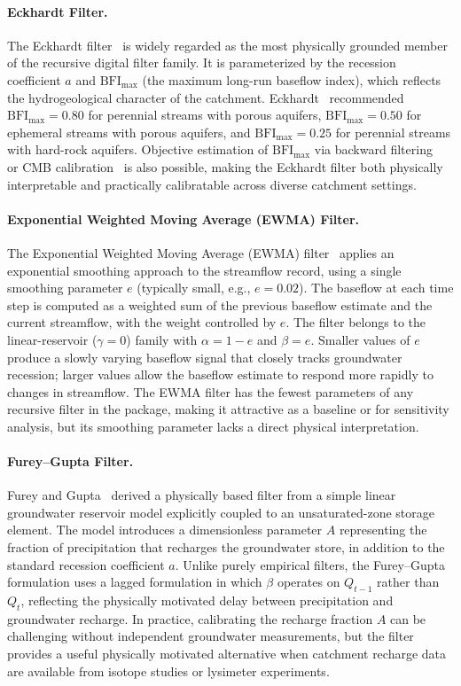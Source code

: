 \documentclass[hydrology,article,submit,pdftex,moreauthors]{Definitions/mdpi}
\begin{document}
\paragraph{Eckhardt Filter.}
The Eckhardt filter~\cite{Eckhardt2005} is widely regarded as the most physically grounded member of the recursive digital filter family. It is parameterized by the recession coefficient $a$ and $\mathrm{BFI_{max}}$ (the maximum long-run baseflow index), which reflects the hydrogeological character of the catchment. Eckhardt~\cite{Eckhardt2005} recommended $\mathrm{BFI_{max}} = 0.80$ for perennial streams with porous aquifers, $\mathrm{BFI_{max}} = 0.50$ for ephemeral streams with porous aquifers, and $\mathrm{BFI_{max}} = 0.25$ for perennial streams with hard-rock aquifers. Objective estimation of $\mathrm{BFI_{max}}$ via backward filtering~\cite{Collischonn2013} or CMB calibration~\cite{Stewart2007} is also possible, making the Eckhardt filter both physically interpretable and practically calibratable across diverse catchment settings.

\paragraph{Exponential Weighted Moving Average (EWMA) Filter.}
The Exponential Weighted Moving Average (EWMA) filter~\cite{Tularam2008} applies an exponential smoothing approach to the streamflow record, using a single smoothing parameter $e$ (typically small, e.g., $e = 0.02$). The baseflow at each time step is computed as a weighted sum of the previous baseflow estimate and the current streamflow, with the weight controlled by $e$. The filter belongs to the linear-reservoir ($\gamma = 0$) family with $\alpha = 1-e$ and $\beta = e$. Smaller values of $e$ produce a slowly varying baseflow signal that closely tracks groundwater recession; larger values allow the baseflow estimate to respond more rapidly to changes in streamflow. The EWMA filter has the fewest parameters of any recursive filter in the package, making it attractive as a baseline or for sensitivity analysis, but its smoothing parameter lacks a direct physical interpretation.

\paragraph{Furey--Gupta Filter.}
Furey and Gupta~\cite{Furey2001} derived a physically based filter from a simple linear groundwater reservoir model explicitly coupled to an unsaturated-zone storage element. The model introduces a dimensionless parameter $A$ representing the fraction of precipitation that recharges the groundwater store, in addition to the standard recession coefficient $a$. Unlike purely empirical filters, the Furey--Gupta formulation uses a lagged formulation in which $\beta$ operates on $Q_{t-1}$ rather than $Q_t$, reflecting the physically motivated delay between precipitation and groundwater recharge. In practice, calibrating the recharge fraction $A$ can be challenging without independent groundwater measurements, but the filter provides a useful physically motivated alternative when catchment recharge data are available from isotope studies or lysimeter experiments.
\end{document}
